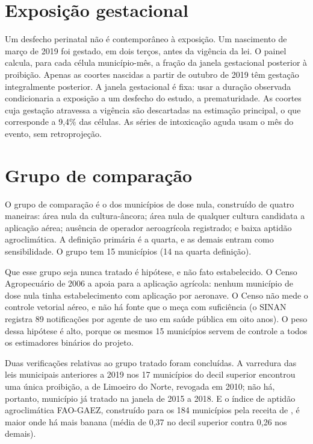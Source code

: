 \section{Exposição gestacional}
\label{sec:exposicao}

Um desfecho perinatal não é contemporâneo à exposição. Um nascimento de março
de 2019 foi gestado, em dois terços, antes da vigência da lei. O painel calcula,
para cada célula município-mês, a fração da janela gestacional posterior à
proibição. Apenas as coortes nascidas a partir de outubro de 2019 têm gestação
integralmente posterior. A janela gestacional é fixa: usar a duração observada
condicionaria a exposição a um desfecho do estudo, a prematuridade. As coortes
cuja gestação atravessa a vigência são descartadas na estimação principal, o
que corresponde a 9,4\% das células. As séries de intoxicação aguda usam o mês
do evento, sem retroprojeção.

\section{Grupo de comparação}
\label{sec:comparacao}

O grupo de comparação é o dos municípios de dose nula, construído de quatro
maneiras: área nula da cultura-âncora; área nula de qualquer cultura candidata
a aplicação aérea; ausência de operador aeroagrícola registrado; e baixa
aptidão agroclimática. A definição primária é a quarta, e as demais entram como
sensibilidade. O grupo tem 15 municípios (14 na quarta definição).

Que esse grupo seja nunca tratado é hipótese, e não fato estabelecido. O Censo
Agropecuário de 2006 a apoia para a aplicação agrícola: nenhum município de
dose nula tinha estabelecimento com aplicação por aeronave. O Censo não mede o
controle vetorial aéreo, e não há fonte que o meça com suficiência (o SINAN
registra 89 notificações por agente de uso em saúde pública em oito anos). O
peso dessa hipótese é alto, porque os mesmos 15 municípios servem de controle a
todos os estimadores binários do projeto.

Duas verificações relativas ao grupo tratado foram concluídas. A varredura das
leis municipais anteriores a 2019 nos 17 municípios do decil superior encontrou
uma única proibição, a de Limoeiro do Norte, revogada em 2010; não há,
portanto, município já tratado na janela de 2015 a 2018. E o índice de aptidão
agroclimática FAO-GAEZ, construído para os 184 municípios pela receita de
\citet{reynier2025glyphosate}, é maior onde há mais banana (média de 0,37 no
decil superior contra 0,26 nos demais). 

